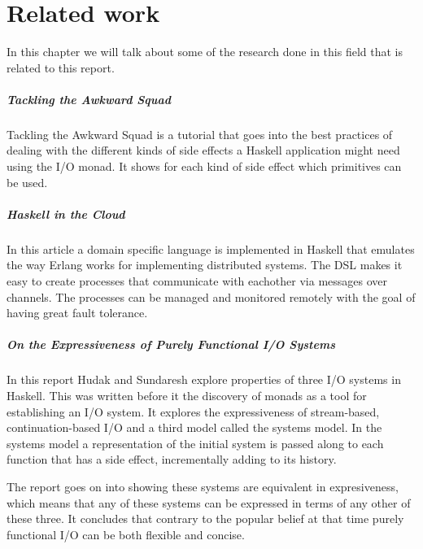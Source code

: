 \chapter{Related work}

In this chapter we will talk about some of the research done in this field that is related to this report.

\paragraph{Tackling the Awkward Squad\cite{Jones02tacklingthe}}
Tackling the Awkward Squad is a tutorial that goes into the best practices of dealing with the different kinds of side effects a Haskell application might need using the I/O monad. It shows for each kind of side effect which primitives can be used.

\paragraph{Haskell in the Cloud\cite{epstein_haskell_????}}
In this article a domain specific language is implemented in Haskell that emulates the way Erlang works for implementing distributed systems. The DSL makes it easy to create processes that communicate with eachother via messages over channels. The processes can be managed and monitored remotely with the goal of having great fault tolerance. 

\paragraph{On the Expressiveness of Purely Functional I/O Systems\cite{Hudak89onthe}}
In this report Hudak and Sundaresh explore properties of three I/O systems in Haskell.
This was written before it the discovery of monads as a tool for establishing an I/O system.
It explores the expressiveness of stream-based, continuation-based I/O and a third model called the systems model. In the systems model a representation of the initial system is passed along to each function that has a side effect, incrementally adding to its history. 

The report goes on into showing these systems are equivalent in expresiveness, which means that any of these systems can be expressed in terms of any other of these three.
It concludes that contrary to the popular belief at that time purely functional I/O can be both flexible and concise.
